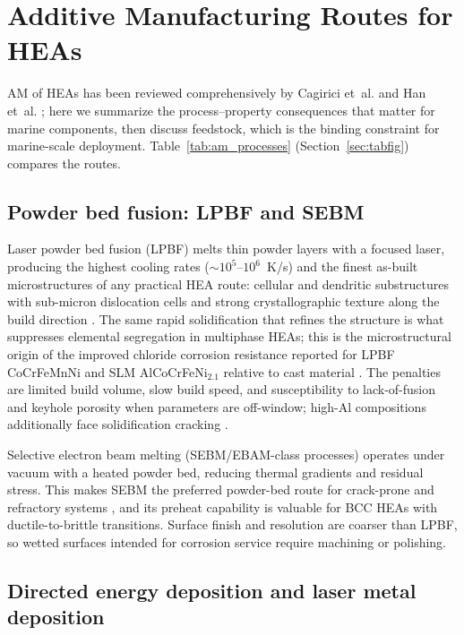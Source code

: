 \section{Additive Manufacturing Routes for HEAs}
\label{sec:am}

AM of HEAs has been reviewed comprehensively by Cagirici et~al. \cite{cagirici2024} and Han et~al. \cite{han2025}; here we summarize the process--property consequences that matter for marine components, then discuss feedstock, which is the binding constraint for marine-scale deployment. Table~\ref{tab:am_processes} (Section~\ref{sec:tabfig}) compares the routes.

\subsection{Powder bed fusion: LPBF and SEBM}

Laser powder bed fusion (LPBF) melts thin powder layers with a focused laser, producing the highest cooling rates ($\sim10^{5}$--$10^{6}$~K/s) and the finest as-built microstructures of any practical HEA route: cellular and dendritic substructures with sub-micron dislocation cells and strong crystallographic texture along the build direction \cite{cagirici2024,han2025}. The same rapid solidification that refines the structure is what suppresses elemental segregation in multiphase HEAs; this is the microstructural origin of the improved chloride corrosion resistance reported for LPBF CoCrFeMnNi and SLM AlCoCrFeNi$_{2.1}$ relative to cast material \cite{lpbf_cantor_2024,slm_ehea_2025}. The penalties are limited build volume, slow build speed, and susceptibility to lack-of-fusion and keyhole porosity when parameters are off-window; high-Al compositions additionally face solidification cracking \cite{cagirici2024}.

Selective electron beam melting (SEBM/EBAM-class processes) operates under vacuum with a heated powder bed, reducing thermal gradients and residual stress. This makes SEBM the preferred powder-bed route for crack-prone and refractory systems \cite{abdullah2024rhea}, and its preheat capability is valuable for BCC HEAs with ductile-to-brittle transitions. Surface finish and resolution are coarser than LPBF, so wetted surfaces intended for corrosion service require machining or polishing.

\subsection{Directed energy deposition and laser metal deposition}

